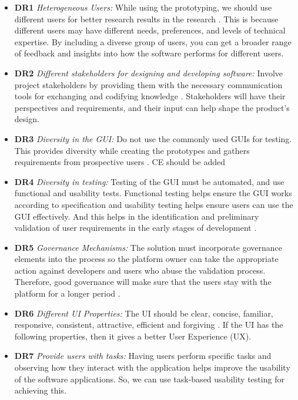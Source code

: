 \begin{itemize}
  \item \textbf{DR1} \textit{Heterogeneous Users:} While using the prototyping, we should use different users for better research results in the research \cite{article:prototyping:weichbroth,misc:lean:steve, misc:lean:burmeister}. This is because different users may have different needs, preferences, and levels of technical expertise. By including a diverse group of users, you can get a broader range of feedback and insights into how the software performs for different users.
  \item \textbf{DR2} \textit{Different stakeholders for designing and developing software:} Involve project stakeholders by providing them with the necessary communication tools for exchanging and codifying knowledge \cite{article:prototyping:weichbroth, misc:prorotypes:lauff}. Stakeholders will have their perspectives and requirements, and their input can help shape the product's design.
  \item \textbf{DR3} \textit{Diversity in the GUI:} Do not use the commonly used GUIs for testing. This provides diversity while creating the prototypes and gathers requirements from prospective users \cite{article:prototyping:weichbroth}. CE should be added
  \item \textbf{DR4} \textit{Diversity in testing:} Testing of the GUI must be automated, and use functional and usability tests. Functional testing helps ensure the GUI works according to specification and usability testing helps ensure users can use the GUI effectively. And this helps in the identification and preliminary validation of user requirements in the early stages of development \cite{article:prototyping:weichbroth}.
  \item \textbf{DR5} \textit{Governance Mechanisms:} The solution must incorporate governance elements into the process so the platform owner can take the appropriate action against developers and users who abuse the validation process. Therefore, good governance will make sure that the users stay with the platform for a longer period \cite{misc:prototypes:evans,misc:dps:parker}. 
  \item \textbf{DR6} \textit{Different UI Properties:} The UI should be clear, concise, familiar, responsive, consistent, attractive, efficient and forgiving \cite{article:prototyping:weichbroth}. If the UI has the following properties, then it gives a better User Experience (UX).
  \item \textbf{DR7} \textit{Provide users with tasks:} Having users perform specific tasks and observing how they interact with the application helps improve the usability of the software applications. So, we can use task-based usability testing for achieving this. 

\end{itemize}

